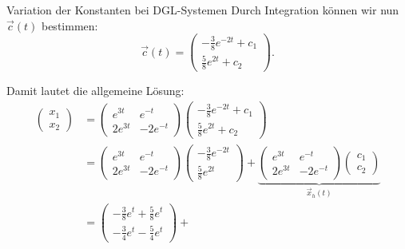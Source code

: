 \begin{bsp}{Variation der Konstanten bei DGL-Systemen}{}
    Durch Integration können wir nun \(\vec{c}(t)\) bestimmen:
    \[
        \vec{c}(t)
        =
        \begin{pmatrix}
            -\frac38 e^{-2t}+c_1 \\[2mm]
            \frac58 e^{2t}+c_2
        \end{pmatrix}.
    \]

    Damit lautet die allgemeine Lösung:
    \[
        \begin{aligned}
            \begin{pmatrix}x_1\\x_2\end{pmatrix}
             & =
            \begin{pmatrix}
                e^{3t}  & e^{-t}   \\
                2e^{3t} & -2e^{-t}
            \end{pmatrix}
            \begin{pmatrix}
                -\frac38 e^{-2t}+c_1 \\[1mm]
                \frac58 e^{2t}+c_2
            \end{pmatrix}            \\[3mm]
             & =
            \begin{pmatrix}
                e^{3t}  & e^{-t}   \\
                2e^{3t} & -2e^{-t}
            \end{pmatrix}
            \begin{pmatrix}
                -\frac38 e^{-2t} \\[1mm]
                \frac58 e^{2t}
            \end{pmatrix}
            +
            \underbrace{
                \begin{pmatrix}
                    e^{3t}  & e^{-t}   \\
                    2e^{3t} & -2e^{-t}
                \end{pmatrix}
                \begin{pmatrix}c_1\\c_2\end{pmatrix}
            }_{\vec{x}_h(t)}    \\[3mm]
             & =
            \begin{pmatrix}
                -\frac38 e^t+\frac58 e^t \\[1mm]
                -\frac34 e^t-\frac54 e^t
            \end{pmatrix}
            +

\end{aligned}\]
\end{bsp}
